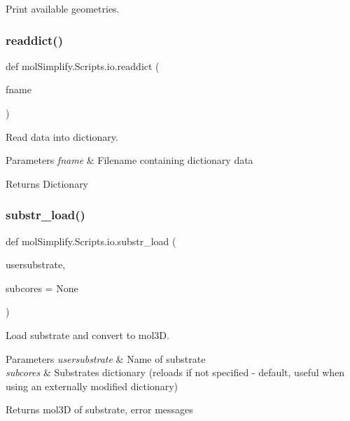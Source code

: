 Print available geometries. 

\mbox{\label{namespacemolSimplify_1_1Scripts_1_1io_a3bbc8b914bae35e79ac16c443f01a077}} 
\subsubsection{\texorpdfstring{readdict()}{readdict()}}
{\footnotesize\ttfamily def mol\+Simplify.\+Scripts.\+io.\+readdict (\begin{DoxyParamCaption}\item[{}]{fname }\end{DoxyParamCaption})}



Read data into dictionary. 


\begin{DoxyParams}{Parameters}
{\em fname} & Filename containing dictionary data \\
\hline
\end{DoxyParams}
\begin{DoxyReturn}{Returns}
Dictionary 
\end{DoxyReturn}
\mbox{\label{namespacemolSimplify_1_1Scripts_1_1io_a350e85d6a6af41250a4b243f870d3cb0}} 
\subsubsection{\texorpdfstring{substr\+\_\+load()}{substr\_load()}}
{\footnotesize\ttfamily def mol\+Simplify.\+Scripts.\+io.\+substr\+\_\+load (\begin{DoxyParamCaption}\item[{}]{usersubstrate,  }\item[{}]{subcores = {\ttfamily None} }\end{DoxyParamCaption})}



Load substrate and convert to mol3D. 


\begin{DoxyParams}{Parameters}
{\em usersubstrate} & Name of substrate \\
\hline
{\em subcores} & Substrates dictionary (reloads if not specified -\/ default, useful when using an externally modified dictionary) \\
\hline
\end{DoxyParams}
\begin{DoxyReturn}{Returns}
mol3D of substrate, error messages 
\end{DoxyReturn}
